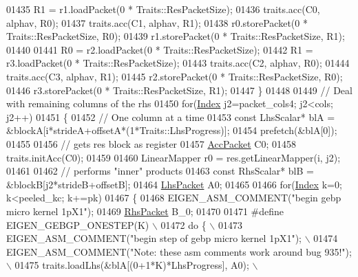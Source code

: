 \begin{DoxyCode}
01435           R1 = r1.loadPacket(0 * Traits::ResPacketSize);
01436           traits.acc(C0, alphav, R0);
01437           traits.acc(C1,  alphav, R1);
01438           r0.storePacket(0 * Traits::ResPacketSize, R0);
01439           r1.storePacket(0 * Traits::ResPacketSize, R1);
01440 
01441           R0 = r2.loadPacket(0 * Traits::ResPacketSize);
01442           R1 = r3.loadPacket(0 * Traits::ResPacketSize);
01443           traits.acc(C2,  alphav, R0);
01444           traits.acc(C3,  alphav, R1);
01445           r2.storePacket(0 * Traits::ResPacketSize, R0);
01446           r3.storePacket(0 * Traits::ResPacketSize, R1);
01447         \}
01448 
01449         \textcolor{comment}{// Deal with remaining columns of the rhs}
01450         \textcolor{keywordflow}{for}(\hyperlink{namespace_eigen_a62e77e0933482dafde8fe197d9a2cfde}{Index} j2=packet\_cols4; j2<cols; j2++)
01451         \{
01452           \textcolor{comment}{// One column at a time}
01453           \textcolor{keyword}{const} LhsScalar* blA = &blockA[i*strideA+offsetA*(1*Traits::LhsProgress)];
01454           prefetch(&blA[0]);
01455 
01456           \textcolor{comment}{// gets res block as register}
01457           \hyperlink{class_eigen_1_1internal_1_1_tensor_lazy_evaluator_writable}{AccPacket} C0;
01458           traits.initAcc(C0);
01459 
01460           LinearMapper r0 = res.getLinearMapper(i, j2);
01461 
01462           \textcolor{comment}{// performs "inner" products}
01463           \textcolor{keyword}{const} RhsScalar* blB = &blockB[j2*strideB+offsetB];
01464           \hyperlink{class_eigen_1_1internal_1_1_tensor_lazy_evaluator_writable}{LhsPacket} A0;
01465 
01466           \textcolor{keywordflow}{for}(\hyperlink{namespace_eigen_a62e77e0933482dafde8fe197d9a2cfde}{Index} k=0; k<peeled\_kc; k+=pk)
01467           \{
01468             EIGEN\_ASM\_COMMENT(\textcolor{stringliteral}{"begin gebp micro kernel 1pX1"});
01469             \hyperlink{class_eigen_1_1internal_1_1_tensor_lazy_evaluator_writable}{RhsPacket} B\_0;
01470         
01471 \textcolor{preprocessor}{#define EIGEN\_GEBGP\_ONESTEP(K) \(\backslash\)}
01472 \textcolor{preprocessor}{            do \{                                                                \(\backslash\)}
01473 \textcolor{preprocessor}{              EIGEN\_ASM\_COMMENT("begin step of gebp micro kernel 1pX1");        \(\backslash\)}
01474 \textcolor{preprocessor}{              EIGEN\_ASM\_COMMENT("Note: these asm comments work around bug 935!"); \(\backslash\)}
01475 \textcolor{preprocessor}{              traits.loadLhs(&blA[(0+1*K)*LhsProgress], A0);                    \(\backslash\)}

\end{DoxyCode}
